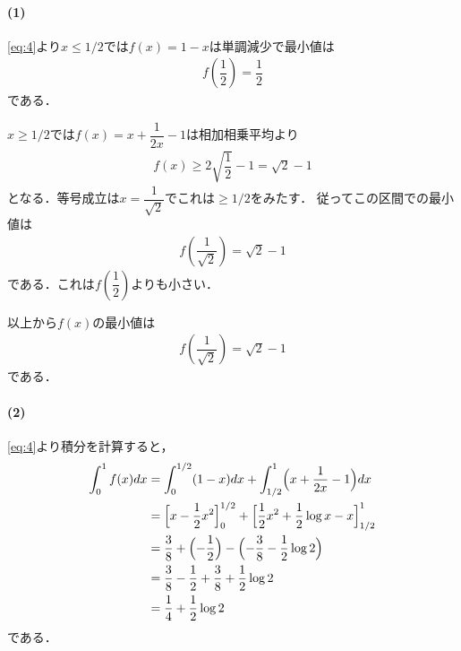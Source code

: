 \documentclass[../../main.tex]{subfiles}
\begin{document}
\paragraph{(1)}

\cref{eq:4}より$x\le1/2$では$f(x)=1-x$は単調減少で最小値は
\begin{align}
  f\left(\dfrac{1}{2}\right) =\dfrac{1}{2}
\end{align}
である．

$x\ge1/2$では$f(x)=x+\dfrac{1}{2x}-1$は相加相乗平均より
\begin{align}
  f(x) \ge 2\sqrt{\dfrac{1}{2}} -1 = \sqrt{2} - 1
\end{align}
となる．等号成立は$x=\dfrac{1}{\sqrt{2}}$でこれは$\ge1/2$をみたす．
従ってこの区間での最小値は
\begin{align}
  f\left(\dfrac{1}{\sqrt{2}}\right) = \sqrt{2} - 1
\end{align}
である．これは$f\left(\dfrac{1}{2}\right)$よりも小さい．

以上から$f(x)$の最小値は
\begin{align}
  f\left(\dfrac{1}{\sqrt{2}}\right) = \sqrt{2} - 1
\end{align}
である．

\paragraph{(2)}

\cref{eq:4}より積分を計算すると，
\begin{align}
  \int_0^1f(x)dx
  &=\int_0^{1/2}(1-x)dx+\int_{1/2}^1\Bigl(x+\dfrac{1}{2x}-1\Bigr)dx\\
  &=\Bigl[x-\dfrac{1}{2}x^2\Bigr]_0^{1/2}+\Bigl[\dfrac{1}{2}x^2+\dfrac{1}{2}\log x-x\Bigr]_{1/2}^1\\
  &=\dfrac{3}{8}+\Bigl(-\dfrac{1}{2}\Bigr)-\Bigl(-\dfrac{3}{8}-\dfrac{1}{2}\log2\Bigr)\\
  &=\dfrac{3}{8}-\dfrac{1}{2}+\dfrac{3}{8}+\dfrac{1}{2}\log2 \\
  &=\dfrac{1}{4}+\dfrac{1}{2}\log2
\end{align}
である．

\newpage
\end{document}
